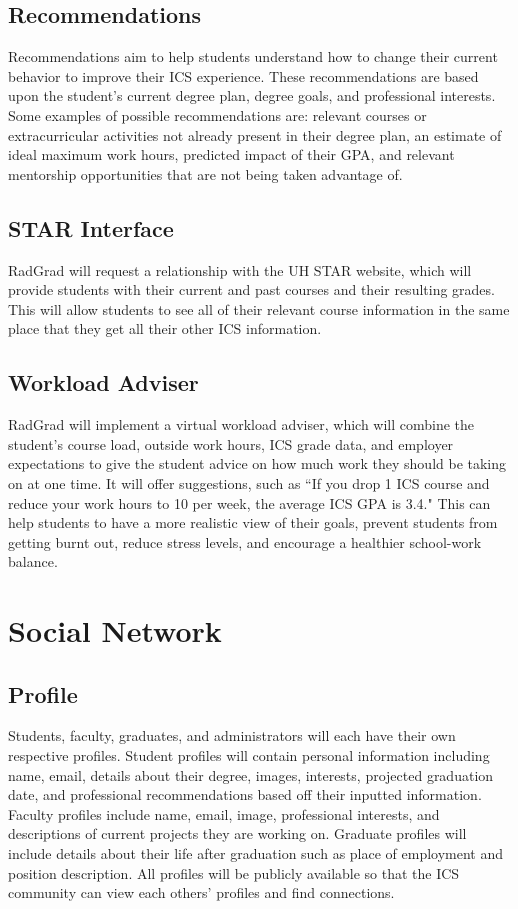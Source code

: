 \subsection{Recommendations}
Recommendations aim to help students understand how to change their current behavior to improve their ICS experience. These recommendations are based upon the student's current degree plan, degree goals, and professional interests. Some examples of possible recommendations are: relevant courses or extracurricular activities not already present in their degree plan, an estimate of ideal maximum work hours, predicted impact of their GPA, and relevant mentorship opportunities that are not being taken advantage of. 
\subsection{STAR Interface}
RadGrad will request a relationship with the UH STAR website, which will provide students with their current and past courses and their resulting grades. This will allow students to see all of their relevant course information in the same place that they get all their other ICS information.
\subsection{Workload Adviser}
RadGrad will implement a virtual workload adviser, which will combine the student's course load, outside work hours, ICS grade data, and employer expectations to give the student advice on how much work they should be taking on at one time. It will offer suggestions, such as ``If you drop 1 ICS course and reduce your work hours to 10 per week, the average ICS GPA is 3.4." This can help students to have a more realistic view of their goals, prevent students from getting burnt out, reduce stress levels, and encourage a healthier school-work balance.

\section{Social Network}
\subsection{Profile}
Students, faculty, graduates, and administrators will each have their own respective profiles. Student profiles will contain personal information including name, email, details about their degree, images, interests, projected graduation date, and professional recommendations based off their inputted information. Faculty profiles include name, email, image, professional interests, and descriptions of current projects they are working on. Graduate profiles will include details about their life after graduation such as place of employment and position description. All profiles will be publicly available so that the ICS community can view each others' profiles and find connections.
